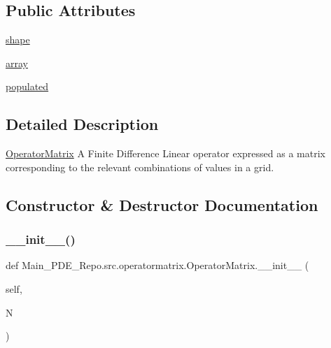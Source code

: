 \subsection*{Public Attributes}
\begin{DoxyCompactItemize}
\item 
\hyperlink{classMain__PDE__Repo_1_1src_1_1operatormatrix_1_1OperatorMatrix_aa973994badfd46a4774be7d9399838e3}{shape}
\item 
\hyperlink{classMain__PDE__Repo_1_1src_1_1operatormatrix_1_1OperatorMatrix_a85c4c68c7cb184de85df6280358ee3d5}{array}
\item 
\hyperlink{classMain__PDE__Repo_1_1src_1_1operatormatrix_1_1OperatorMatrix_a2895edbf574cf039646d85a7ac9a6b78}{populated}
\end{DoxyCompactItemize}


\subsection{Detailed Description}
\hyperlink{classMain__PDE__Repo_1_1src_1_1operatormatrix_1_1OperatorMatrix}{Operator\+Matrix} A Finite Difference Linear operator expressed as a matrix corresponding to the relevant combinations of values in a grid. 

\subsection{Constructor \& Destructor Documentation}
\mbox{\label{classMain__PDE__Repo_1_1src_1_1operatormatrix_1_1OperatorMatrix_a15495a68ab1363574aa90ce186112902}} 
\subsubsection{\texorpdfstring{\+\_\+\+\_\+init\+\_\+\+\_\+()}{\_\_init\_\_()}}
{\footnotesize\ttfamily def Main\+\_\+\+P\+D\+E\+\_\+\+Repo.\+src.\+operatormatrix.\+Operator\+Matrix.\+\_\+\+\_\+init\+\_\+\+\_\+ (\begin{DoxyParamCaption}\item[{}]{self,  }\item[{}]{N }\end{DoxyParamCaption})}



